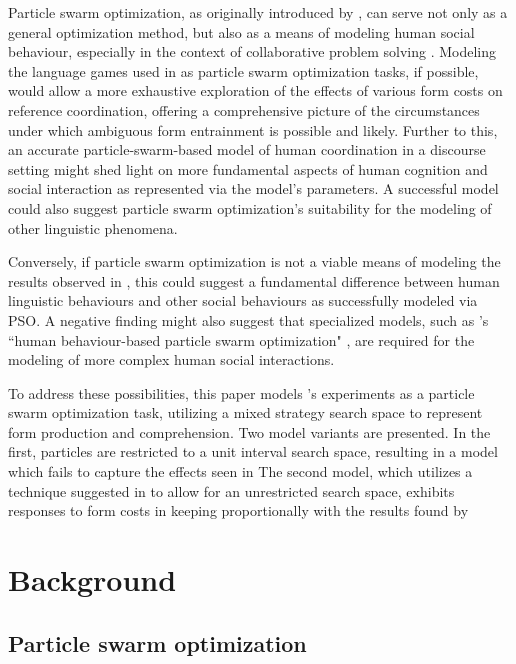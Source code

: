 \documentclass[12pt]{article}
\begin{document}
Particle swarm optimization, as originally introduced by \citet*{kennedyeberhart1995}, can serve not only as a general optimization method, but also as a means of modeling human social behaviour, especially in the context of collaborative problem solving \citep{kennedy1997}. Modeling the language games used in \citeauthor{rohde2012} as particle swarm optimization tasks, if possible, would allow a more exhaustive exploration of the effects of various form costs on reference coordination, offering a comprehensive picture of the circumstances under which ambiguous form entrainment is possible and likely. Further to this, an accurate particle-swarm-based model of human coordination in a discourse setting might shed light on more fundamental aspects of human cognition and social interaction as represented via the model's parameters. A successful model could also suggest particle swarm optimization's suitability for the modeling of other linguistic phenomena. 

Conversely, if particle swarm optimization is not a viable means of modeling the results observed in \citeauthor{rohde2012}, this could suggest a fundamental difference between human linguistic behaviours and other social behaviours as successfully modeled via PSO. A negative finding might also suggest that specialized models, such as \citeauthor{liu2014}'s ``human behaviour-based particle swarm optimization" \citeyearpar{liu2014}, are required for the modeling of more complex human social interactions.

To address these possibilities, this paper models \citeauthor{rohde2012}'s experiments as a particle swarm optimization task, utilizing a mixed strategy search space to represent form production and comprehension. Two model variants are presented. In the first, particles are restricted to a unit interval search space, resulting in a model which fails to capture the effects seen in \citeauthor{rohde2012} The second model, which utilizes a technique suggested in \citealt[p. 252]{engelbrecht2005} to allow for an unrestricted search space, exhibits responses to form costs in keeping proportionally with the results found by  \citeauthor{rohde2012}



\section{Background}
\subsection{Particle swarm optimization}
\end{document}
